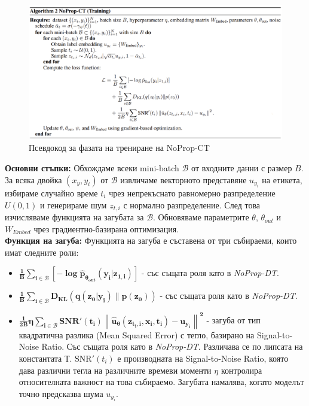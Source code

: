 \documentclass[a4paper,11pt]{article}
\begin{document}
\begin{figure}[H]
    \centering
    \includegraphics[width=6.26in,keepaspectratio]{images/NoProp-CT Training Pseudocode.png}
    \caption{Псевдокод за фазата на трениране на NoProp-CT}
\end{figure}

\textbf{Основни стъпки:}
Обхождаме всеки mini-batch \(\mathcal{B}\) от входните данни с размер \(B\). За всяка двойка \((x_{y}, y_{i})\) от \(\mathcal{B}\) извличаме векторното представяне \(u_{y_{i}}\) на етикета, избираме случайно време \(t_{i}\) чрез непрекъснато равномерно разпределение \(U(0, 1)\) и генерираме шум \(z_{t, i}\) с нормално разпределение. След това изчисляваме функцията на загубата за \(\mathcal{B}\). Обновяваме параметрите \(\theta\), \(\theta_{out}\) и \(W_{Embed}\) чрез градиентно-базирана оптимизация. \\

\textbf{Функция на загуба:}
Функцията на загуба е съставена от три събираеми, които имат следните роли:
\begin{itemize}
    \item \(\mathbf{\frac{1}{B} \sum\limits_{i \in \mathcal{B}} \left[ -\log \hat{p}_{\theta_{\text{out}}}(y_i | z_{1,i}) \right]}\) - със същата роля като в \emph{NoProp-DT}.
    \item \(\mathbf{\frac{1}{B} \sum\limits_{i \in \mathcal{B}} D_{\text{KL}}(q(z_0|y_i) \| p(z_0))}\) - със същата роля като в \emph{NoProp-DT}.
    \item \(\mathbf{\frac{1}{2B} \eta \sum\limits_{i \in \mathcal{B}} \text{SNR}'(t_i) \left\| \hat{u}_\theta(z_{t_i,i}, x_i, t_i) - u_{y_i} \right\|^2}\) - загуба от тип квадратична разлика (Mean Squared Error) с тегло, базирано на Signal-to-Noise Ratio. Със същата роля като в \emph{NoProp-DT}. Различава се по липсата на константата $Т$. \(\text{SNR}'(t_i)\) е производната на Signal-to-Noise Ratio, която дава различни тегла на различните времеви моменти \(\eta\) контролира относителната важност на това събираемо. Загубата намалява, когато моделът точно предсказва шума \(u_{y_{i}}\).
\end{itemize}
\end{document}
